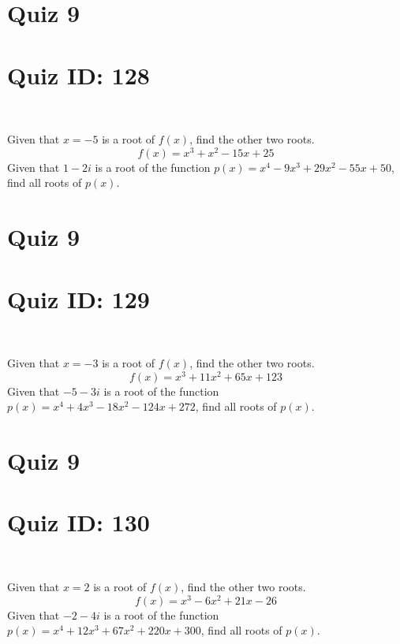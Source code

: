 \documentclass{exam}
\begin{document}
\section*{Quiz 9}
\section*{Quiz ID: 128}
\vspace{0.5cm}\
\vspace{1cm}\
\begin{questions}
\question Given that $x=-5$ is a root of $f(x)$, find the other two roots.\[f(x)=
x^3 + x^2 - 15x + 25\]
\newpage
\question Given that $1-2\mathit{i}$ is a root of the function $p(x)=
x^4 - 9x^3 + 29x^2 - 55x + 50$, find all roots of $p(x)$. 
\end{questions}\newpage
\newpage
\section*{Quiz 9}
\section*{Quiz ID: 129}
\vspace{0.5cm}\
\vspace{1cm}\
\begin{questions}
\question Given that $x=-3$ is a root of $f(x)$, find the other two roots.\[f(x)=
x^3 + 11x^2 + 65x + 123\]
\newpage
\question Given that $-5-3\mathit{i}$ is a root of the function $p(x)=
x^4 + 4x^3 - 18x^2 - 124x + 272$, find all roots of $p(x)$. \makeemptybox{\stretch{1}}
\end{questions}\newpage
\newpage
\section*{Quiz 9}
\section*{Quiz ID: 130}
\vspace{0.5cm}\
\vspace{1cm}\
\begin{questions}
\question Given that $x=2$ is a root of $f(x)$, find the other two roots.\[f(x)=
x^3 - 6x^2 + 21x - 26\]
\newpage
\question Given that $-2-4\mathit{i}$ is a root of the function $p(x)=
x^4 + 12x^3 + 67x^2 + 220x + 300$, find all roots of $p(x)$. \makeemptybox{\stretch{1}}
\end{questions}\newpage
\newpage
\end{document}
